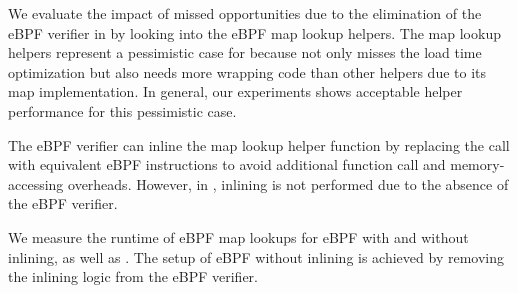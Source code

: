 We evaluate the impact of missed opportunities due to the elimination of
    the eBPF verifier in \projname{} by looking into the eBPF map lookup
    helpers.
The map lookup helpers represent a pessimistic case for \projname{} because
    \projname{} not only misses the load time optimization but also needs more
    wrapping code than other helpers due to its map implementation.
In general, our experiments shows acceptable helper performance for this
    pessimistic case.

The eBPF verifier can inline the map lookup
    helper function by replacing the call with equivalent eBPF instructions to
    avoid additional function call and memory-accessing overheads.
However, in \projname{}, inlining is not performed due to the absence of the
    eBPF verifier. %

We measure the runtime of eBPF map lookups for eBPF with and without inlining,
    as well as \projname{}.
The setup of eBPF without inlining is achieved by removing the inlining logic
    from the eBPF verifier.

